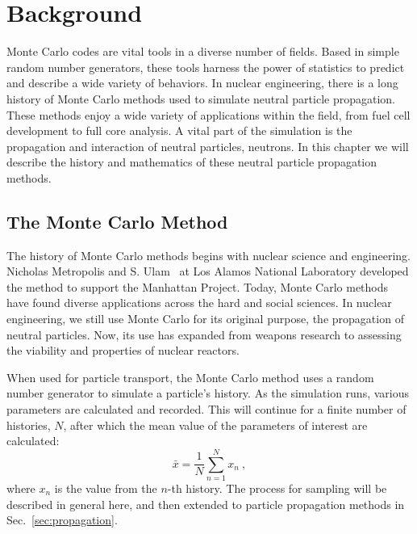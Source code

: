 
\chapter{Background}
\label{chap:background}

Monte Carlo codes are vital tools in a diverse number of fields. Based
in simple random number generators, these tools harness the power of
statistics to predict and describe a wide variety of behaviors. In
nuclear engineering, there is a long history of Monte Carlo methods
used to simulate neutral particle propagation. These methods enjoy a
wide variety of applications within the field, from fuel cell
development to full core analysis. A vital part of the simulation is
the propagation and interaction of neutral particles, neutrons. In
this chapter we will describe the history and mathematics of these
neutral particle propagation methods.

\section{The Monte Carlo Method}
\label{sec:monte_carlo}

The history of Monte Carlo methods begins with nuclear science and
engineering. Nicholas Metropolis and S. Ulam~\cite{metropolis1949} at
Los Alamos National Laboratory developed the method to support the
Manhattan Project. Today, Monte Carlo methods have found diverse
applications across the hard and social sciences. In nuclear
engineering, we still use Monte Carlo for its original purpose, the
propagation of neutral particles. Now, its use has expanded from
weapons research to assessing the viability and properties of nuclear
reactors.

When used for particle transport, the Monte Carlo method uses a random
number generator to simulate a particle's history. As the simulation
runs, various parameters are calculated and recorded. This will continue
for a finite number of histories, $N$, after which the mean value of
the parameters of interest are calculated:
\begin{equation*}
  \bar{x} = \frac{1}{N}\sum_{n=1}^Nx_n\:,
\end{equation*}
where $x_n$ is the value from the $n$-th history\cite{lewis1993}. The process
for sampling will be described in general here, and then extended to
particle propagation methods in Sec.~\ref{sec:propagation}.

